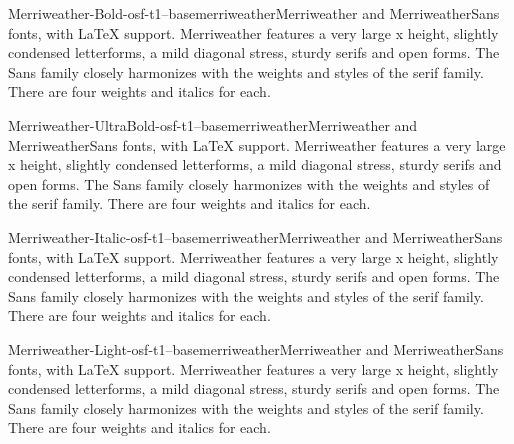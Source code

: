 \documentclass{ddltxtyp}
\begin{document}
\begin{package}{Merriweather-Bold-osf-t1--base}{merriweather}{Merriweather and MerriweatherSans fonts, with {\LaTeX} support.}
Merriweather features a very large x height, slightly condensed
letterforms, a mild diagonal stress, sturdy serifs and open
forms. The Sans family closely harmonizes with the weights and
styles of the serif family. There are four weights and italics
for each.
\end{package}
\begin{package}{Merriweather-UltraBold-osf-t1--base}{merriweather}{Merriweather and MerriweatherSans fonts, with {\LaTeX} support.}
Merriweather features a very large x height, slightly condensed
letterforms, a mild diagonal stress, sturdy serifs and open
forms. The Sans family closely harmonizes with the weights and
styles of the serif family. There are four weights and italics
for each.
\end{package}
\begin{package}{Merriweather-Italic-osf-t1--base}{merriweather}{Merriweather and MerriweatherSans fonts, with {\LaTeX} support.}
Merriweather features a very large x height, slightly condensed
letterforms, a mild diagonal stress, sturdy serifs and open
forms. The Sans family closely harmonizes with the weights and
styles of the serif family. There are four weights and italics
for each.
\end{package}
\begin{package}{Merriweather-Light-osf-t1--base}{merriweather}{Merriweather and MerriweatherSans fonts, with {\LaTeX} support.}
Merriweather features a very large x height, slightly condensed
letterforms, a mild diagonal stress, sturdy serifs and open
forms. The Sans family closely harmonizes with the weights and
styles of the serif family. There are four weights and italics
for each.
\end{package}
\end{document}
